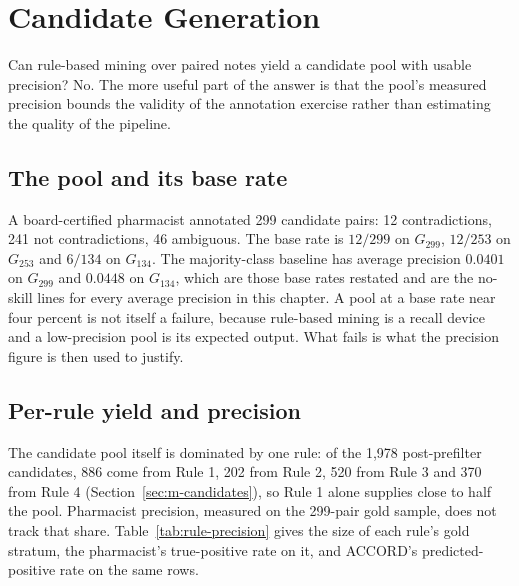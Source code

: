 \section{Candidate Generation}
\label{sec:res-rq1}

Can rule-based mining over paired notes yield a candidate pool with usable
precision? No. The more useful part of the answer is that the pool's measured
precision bounds the validity of the annotation exercise rather than estimating
the quality of the pipeline.

\subsection{The pool and its base rate}

A board-certified pharmacist annotated 299 candidate pairs: 12 contradictions,
241 not contradictions, 46 ambiguous. The base rate is $12/299$ on $G_{299}$,
$12/253$ on $G_{253}$ and $6/134$ on $G_{134}$. The majority-class baseline has
average precision $0.0401$ on $G_{299}$ and $0.0448$ on $G_{134}$, which are
those base rates restated and are the no-skill lines for every average precision
in this chapter. A pool at a base rate near four percent is not itself a failure,
because rule-based mining is a recall device and a low-precision pool is its
expected output. What fails is what the precision figure is then used to justify.

\subsection{Per-rule yield and precision}

The candidate pool itself is dominated by one rule: of the 1,978 post-prefilter candidates,
886 come from Rule 1, 202 from Rule 2, 520 from Rule 3 and 370 from Rule 4
(Section~\ref{sec:m-candidates}), so Rule 1 alone supplies close to half the pool. Pharmacist
precision, measured on the 299-pair gold sample, does not track that share. Table~\ref{tab:rule-precision}
gives the size of each rule's gold stratum, the pharmacist's true-positive rate on it, and ACCORD's
predicted-positive rate on the same rows.

